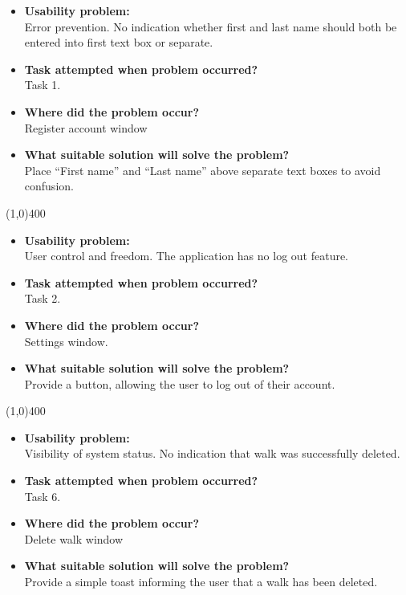 \documentclass[11pt,a4paper]{article}
\begin{document}
\begin{itemize}
	\item\textbf{Usability problem:}\\
	Error prevention. No indication whether first and last name should both be entered into first text box or separate.

	\item\textbf{Task attempted when problem occurred?}\\
	Task 1.

	\item\textbf{Where did the problem occur?}\\
	Register account window

	\item\textbf{What suitable solution will solve the problem?}\\
	Place ``First name'' and ``Last name'' above separate text boxes to avoid confusion.
\end{itemize}

\line(1,0){400}

\begin{itemize}
	\item\textbf{Usability problem:}\\
	User control and freedom. The application has no log out feature.

	\item\textbf{Task attempted when problem occurred?}\\
	Task 2.

	\item\textbf{Where did the problem occur?}\\
	Settings window.

	\item\textbf{What suitable solution will solve the problem?}\\
	Provide a button, allowing the user to log out of their account.
\end{itemize}

\line(1,0){400}

\begin{itemize}
	\item\textbf{Usability problem:}\\
	Visibility of system status. No indication that walk was successfully deleted.

	\item\textbf{Task attempted when problem occurred?}\\
	Task 6.

	\item\textbf{Where did the problem occur?}\\
	Delete walk window

	\item\textbf{What suitable solution will solve the problem?}\\
	Provide a simple toast informing the user that a walk has been deleted.
\end{itemize}
\end{document}
